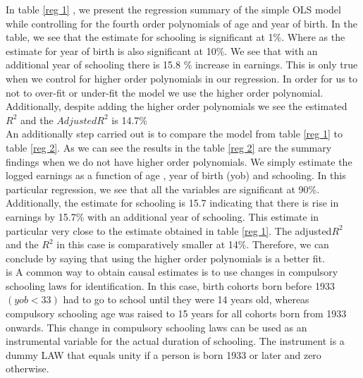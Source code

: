 \documentclass[a4paper,12pt,oneside,English]{article}
\begin{document}
In table \ref{reg 1} , we present the regression summary of the simple OLS model while controlling for the fourth order polynomials of age and year of birth. In the table, we see that the estimate for schooling is significant at 1\%. Where as the estimate for year of birth is also significant at 10\%. We see that with an additional year of schooling there is 15.8 \% increase in earnings. This is only true when we control for higher order polynomials in our regression. In order for us to not to over-fit or under-fit the model we use the higher order polynomial. Additionally, despite adding the higher order polynomials we see the estimated $R^2$ and the $Adjusted R^2$  is 14.7\%\\

An additionally step carried out is to compare the model from table \ref{reg 1} to table \ref{reg 2}. As we can see the results in the table \ref{reg 2}
are the summary findings when we do not have higher order polynomials. We simply estimate the logged earnings as a function of age , year of birth (yob) and schooling. In this particular regression, we see that all the variables are significant at 90\%. Additionally, the estimate for schooling is 15.7 indicating that there is rise in earnings by 15.7\% with an additional year of schooling. This estimate in particular very close to the estimate obtained in table \ref{reg 1}. The adjusted$R^2$ and the $R^2$ in this case is comparatively smaller at 14\%. Therefore, we can conclude by saying that using the higher order polynomials is a better fit.\\
is A common way to obtain causal estimates is to use changes in compulsory schooling laws for identification. In this case, birth cohorts born before 1933 $(yob<33)$ had to go to school until they were 14 years old, whereas compulsory schooling age was raised to 15 years for all cohorts born from 1933 onwards. This change in compulsory schooling laws can be used as an instrumental variable for the actual duration of schooling. The instrument is a dummy LAW that equals unity if a person is born 1933 or later and zero otherwise.
\end{document}
